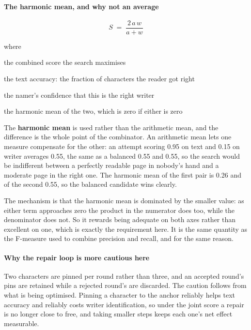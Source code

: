 \paragraph{The harmonic mean, and why not an average}

\begin{equation}
S \;=\; \frac{2\,a\,w}{a + w}
\end{equation}

\noindent where
\begin{description}[leftmargin=2.4em,style=nextline,font=\normalfont\ttfamily]\setlength\itemsep{1pt}
  \item[{$S$}] \normalfont the combined score the search maximises
  \item[{$a$}] \normalfont the text accuracy: the fraction of characters the reader got right
  \item[{$w$}] \normalfont the namer's confidence that this is the right writer
  \item[{$2aw/(a+w)$}] \normalfont the harmonic mean of the two, which is zero if either is zero
\end{description}
The \textbf{harmonic mean} is used rather than the arithmetic mean, and the difference is the whole point of the combinator. An arithmetic mean lets one measure compensate for the other: an attempt scoring 0.95 on text and 0.15 on writer averages 0.55, the same as a balanced 0.55 and 0.55, so the search would be indifferent between a perfectly readable page in nobody's hand and a moderate page in the right one. The harmonic mean of the first pair is 0.26 and of the second 0.55, so the balanced candidate wins clearly.

The mechanism is that the harmonic mean is dominated by the smaller value: as either term approaches zero the product in the numerator does too, while the denominator does not. So it rewards being adequate on both axes rather than excellent on one, which is exactly the requirement here. It is the same quantity as the F-measure used to combine precision and recall, and for the same reason.


\paragraph{Why the repair loop is more cautious here}
Two characters are pinned per round rather than three, and an accepted round's pins are retained while a rejected round's are discarded. The caution follows from what is being optimised. Pinning a character to the anchor reliably helps text accuracy and reliably costs writer identification, so under the joint score a repair is no longer close to free, and taking smaller steps keeps each one's net effect measurable.


